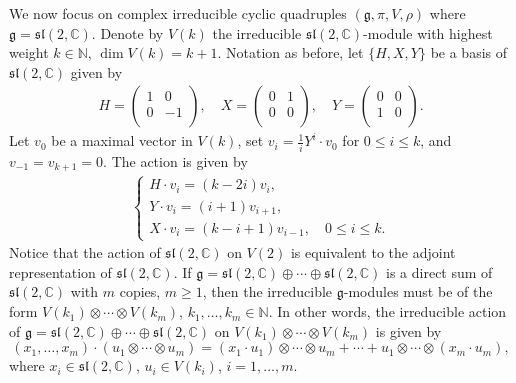 \documentclass[reqno]{amsart}
\theoremstyle{definition}
\begin{document}
We now focus on complex irreducible cyclic quadruples  $(\mathfrak{g},\pi,V,\rho)$ where $\mathfrak{g}=\mathfrak{sl}(2,\mathbb{C})$.
Denote by $V(k)$ the irreducible $\mathfrak{sl}(2,\mathbb{C})$-module with highest weight $k\in \mathbb{N}$, $\dim V(k)=k+1$. Notation as before, let $\{H,X,Y\}$ be a basis of $\mathfrak{sl}(2,\mathbb{C})$ given by
\begin{eqnarray*}
H=\left(
                  \begin{array}{cc}
                    1 & 0 \\
                    0 & -1 \\
                  \end{array}
                \right),\quad
 X=\left(
            \begin{array}{cc}
              0 & 1 \\
              0 & 0 \\
            \end{array}
          \right),\quad
 Y=\left(
            \begin{array}{cc}
              0 & 0 \\
              1 & 0 \\
            \end{array}
          \right).
\end{eqnarray*}
Let $v_{0}$ be  a maximal vector in $V(k)$,  set  $v_{i}=\frac{1}{i}Y^{i}\cdot v_{0}$ for $0\leq i\leq k$,
and  $v_{-1}=v_{k+1}=0$. The action is given by
\begin{eqnarray*}
\begin{cases}
H\cdot v_{i}=(k-2i)v_{i},\\
Y\cdot v_{i}=(i+1)v_{i+1},\\
X\cdot v_{i}=(k-i+1)v_{i-1},\quad 0\leq i\leq k.
\end{cases}
\end{eqnarray*}
Notice that the action of $\mathfrak{sl}(2,\mathbb{C})$ on  $V(2)$ is equivalent to the adjoint representation of $\mathfrak{sl}(2,\mathbb{C})$.
If  $\mathfrak{g}=\mathfrak{sl}(2,\mathbb{C})\oplus\cdots\oplus\mathfrak{sl}(2,\mathbb{C})$
 is a direct sum of $\mathfrak{sl}(2,\mathbb{C})$ with $m$ copies, $m\geq1$, then the irreducible
 $\mathfrak{g}$-modules must be of the form $V(k_{1})\otimes\cdots\otimes V(k_{m})$, $k_{1},\ldots,k_{m}\in \mathbb{N}$.
 In other words, the irreducible action of  $\mathfrak{g}=\mathfrak{sl}(2,\mathbb{C})\oplus\cdots\oplus\mathfrak{sl}(2,\mathbb{C})$ on $V(k_{1})\otimes\cdots\otimes V(k_{m})$ is given by
 \begin{equation*}
   (x_{1},\ldots,x_{m})\cdot (u_{1}\otimes \cdots\otimes u_{m})
   =(x_{1}\cdot u_{1})\otimes \cdots\otimes u_{m}+\cdots+u_{1}\otimes \cdots\otimes (x_{m}\cdot u_{m}),
 \end{equation*}
where $x_{i}\in \mathfrak{sl}(2,\mathbb{C})$, $u_{i}\in V(k_{i})$, $i=1,\ldots,m$.
\end{document}
